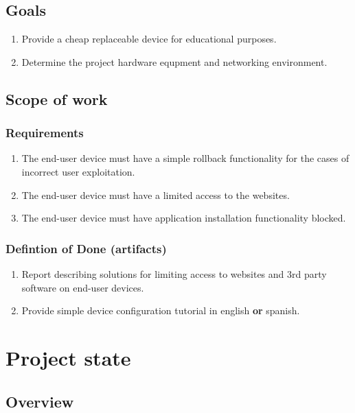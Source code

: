 \documentclass[a4paper, sans, booktabs, totpages, english]{report}
\begin{document}
\chapter{Goals}

\begin{enumerate}
\item Provide a cheap replaceable device for educational purposes.
\item Determine the project hardware equpment and networking environment.
\end{enumerate}


\chapter{Scope of work}

\section{Requirements}

\begin{enumerate}
\item The end-user device must have a simple rollback functionality for
the cases of incorrect user exploitation.
\item The end-user device must have a limited access to the websites.
\item The end-user device must have application installation
functionality blocked.
\end{enumerate}

\section{Defintion of Done (artifacts)}

\begin{enumerate}
\item Report describing solutions for limiting access to websites and
3rd party software on end-user devices.
\item Provide simple device configuration tutorial in english
\textbf{or} spanish.
\end{enumerate}


\part{Project state}

\chapter{Overview}
\end{document}
